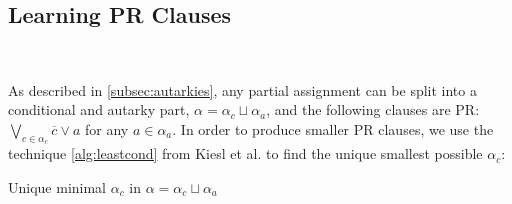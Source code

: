 





\subsection{Learning PR Clauses}~\label{subsec:learning}


As described in \autoref{subsec:autarkies}, any partial assignment can be split 
into a conditional and autarky part, 
$\alpha = \alpha_c \sqcup \alpha_a$, 
and the following clauses are PR: $\bigvee_{c \in \alpha_c} \overline{c} \lor a$ for
any $a \in \alpha_a$. 
In order to produce smaller PR clauses, we use the technique 
\autoref{alg:leastcond} from Kiesl et al.
\cite{conditionalautarkies} to find the unique smallest possible $\alpha_c$:



\begin{algorithm}
    \caption{Unique minimal $\alpha_c$ in $\alpha = \alpha_c \sqcup \alpha_a$}\label{alg:leastcond}
    \SetAlgoNoLine

\end{algorithm}

